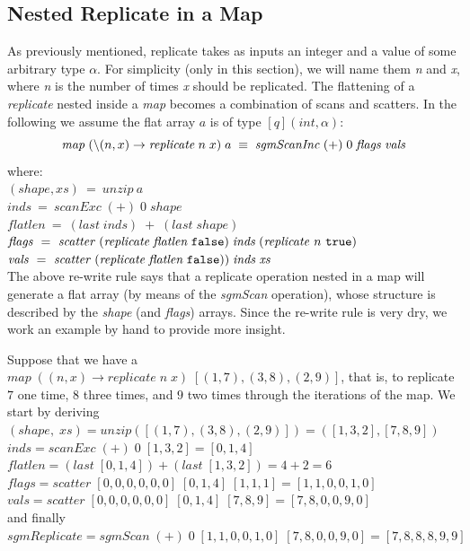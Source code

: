 \subsection{Nested Replicate in a Map}
\label{chapter:section:flattening:replicate}
As previously mentioned, replicate takes as inputs an integer and a value of some arbitrary type $\alpha$. For simplicity (only in this section), we will name them \textit{n} and \textit{x}, where \textit{n} is the number of times \textit{x} should be replicated. The flattening of a \textit{replicate} nested inside a \textit{map} becomes a combination of scans and scatters. In the following we assume the flat array $a$ is of type $[q](\mathit{int},\alpha)$:
\begin{equation}
\centering
\nonumber
\mathit{map}\;(\backslash(n,x)\rightarrow \mathit{replicate}\;n\;x)\;a\;
\equiv\; \mathit{sgmScanInc}\;(+)\;0\;\mathit{flags}\;\mathit{vals}
\end{equation}
where:\\
$(\mathit{shape},\mathit{xs})~=~\mathit{unzip}~a$\\
$\mathit{inds}~=~\mathit{scanExc}\;(+)\;0\;\mathit{shape}$\\
$\mathit{flatlen}~=~(\mathit{last}\;\mathit{inds})\;+\;(\mathit{last}\;\mathit{shape})$\\
$\mathit{flags}~=~\mathit{scatter}\;(\mathit{replicate}\;\mathit{flatlen}\;\mbox{\tt false})\;\mathit{inds}\;(\mathit{replicate}~n~\mbox{\tt true})$\\
$\mathit{vals}~=~\mathit{scatter}\;(\mathit{replicate}\;\mathit{flatlen}\;\mbox{\tt false}))\;\mathit{inds}\;\mathit{xs}$\\

The above re-write rule says that a replicate operation nested in a map will generate a flat array (by means of the \textit{sgmScan} operation), whose structure is described by the \textit{shape} (and \textit{flags}) arrays. Since the re-write rule is very dry, we work an example by hand to provide more insight.

Suppose that we have a $\mathit{map}\;((n,x)\rightarrow \mathit{replicate}\;n\;x)\;[(1,7), (3,8), (2,9)]$, that is, to replicate $7$ one time, $8$ three times, and $9$ two times through the iterations of the map. We start by deriving \\
$(\mathit{shape},\;\mathit{xs})=\mathit{unzip}([(1,7),(3,8),(2,9)])=([1,3,2],[7,8,9])$\\
$\mathit{inds}=\mathit{scanExc}\;(+)\;0\;[1,3,2]=[0,1,4]$\\
$\mathit{flatlen}=(\mathit{last}\;[0,1,4])+(\mathit{last}\;[1,3,2])=4+2=6$\\
$\mathit{flags}=\mathit{scatter}\;[0,0,0,0,0,0]\;[0,1,4]\;[1,1,1]=[1,1,0,0,1,0]$\\
$\mathit{vals}=\mathit{scatter}\;[0,0,0,0,0,0]\;[0,1,4]\;[7,8,9]=[7,8,0,0,9,0]$\\
and finally\\
$\mathit{sgmReplicate}=\mathit{sgmScan}\;(+)\;0\;[1,1,0,0,1,0]\;[7,8,0,0,9,0]=[7,8,8,8,9,9]$

